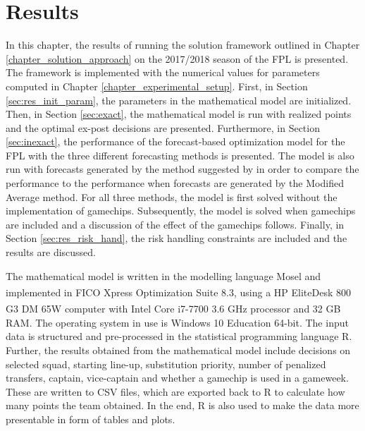 
\chapter{Results} \label{chapter_computational_study}

In this chapter, the results of running the solution framework outlined in Chapter \ref{chapter_solution_approach} on the 2017/2018 season of the FPL is presented. The framework is implemented with the numerical values for parameters computed in Chapter \ref{chapter_experimental_setup}. First, in Section \ref{sec:res_init_param}, the parameters in the mathematical model are initialized. Then, in Section \ref{sec:exact}, the mathematical model is run with realized points and the optimal ex-post decisions are presented. Furthermore, in Section \ref{sec:inexact}, the performance of the forecast-based optimization model for the FPL with the three different forecasting methods is presented. The model is also run with forecasts generated by the method suggested by \cite{Bonomo} in order to compare the performance to the performance when forecasts are generated by the Modified Average method. For all three methods, the model is first solved without the implementation of gamechips. Subsequently, the model is solved when gamechips are included and a discussion of the effect of the gamechips follows. Finally, in Section \ref{sec:res_risk_hand}, the risk handling constraints are included and the results are discussed.

\newpar

The mathematical model is written in the modelling language Mosel and implemented in FICO\textsuperscript {\textregistered} Xpress Optimization Suite 8.3, using a HP EliteDesk 800 G3 DM 65W computer with Intel\textsuperscript{\textregistered} Core\textsuperscript{\texttrademark} i7-7700 3.6 GHz processor and 32 GB RAM. The operating system in use is Windows 10 Education 64-bit. The input data is structured and pre-processed in the statistical programming language R. Further, the results obtained from the mathematical model include decisions on selected squad, starting line-up, substitution priority, number of penalized transfers, captain, vice-captain and whether a gamechip is used in a gameweek. These are written to CSV files, which are exported back to R to calculate how many points the team obtained. In the end, R is also used to make the data more presentable in form of tables and plots. 

